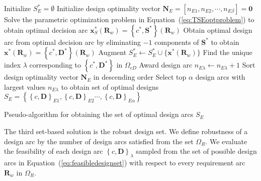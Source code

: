 \begin{algorithm}
	\DontPrintSemicolon %
	{\color{red} Initialize $S_{E}^* = \emptyset$}\;	
	Initialize design optimality vector $\mathbf{N}_E = \left[n_{E1},n_{E2},\cdots,n_{E\beta}\right] = \mathbf{0}$\;	
	 {
		Solve the parametric optimization problem in Equation~(\ref{eq:TSEoptproblem}) to obtain optimal decision arc $\mathbf{x}_S^*(\mathbf{R}_w) = \left\{c^*,\mathbf{S}^*\right\}(\mathbf{R}_w)$\;
		{\color{red}Obtain optimal design arc from optimal decision arc} by eliminating $-1$ components of $\mathbf{S}^*$ to obtain $\mathbf{x}^*(\mathbf{R}_w) = \left\{c^*,\mathbf{D}^*\right\}(\mathbf{R}_w)$\;
		Augment $S_{E}^* \gets S_{E}^* \cup \{ \mathbf{x}^*(\mathbf{R}_w) \} $\;
		Find the unique index $\lambda$ corresponding to $\left\{c^*,\mathbf{D}^*\right\}$ in $\Omega_{cD}$\;
		Award design arc $n_{E\lambda} \gets n_{E\lambda} + 1$\;
	}
	Sort design optimality vector $\mathbf{N}_E$ in descending order\;
	Select top $\alpha$ design arcs with largest values $n_{E\lambda}$ to obtain set of optimal designs $S_E = \left\{\left\{c,\mathbf{D}\right\}_{E1},\left\{c,\mathbf{D}\right\}_{E2}\cdots,\left\{c,\mathbf{D}\right\}_{E\alpha}\right\}$\;
	\caption{Pseudo-algorithm for obtaining the set of optimal design arcs $S_{E}$}
	\label{algo:SBDOptalgo}
\end{algorithm}

The third set-based solution is the robust design set. We define robustness of a design arc by the number of design arcs satisfied from the set $\Omega_R$. We evaluate the feasibility of each design arc $\left\{c,\mathbf{D}\right\}_\lambda$ sampled from the set of possible design arcs in Equation~(\ref{eq:feasibledesignset}) with respect to every requirement arc $\mathbf{R}_w$ in $\Omega_R$.

